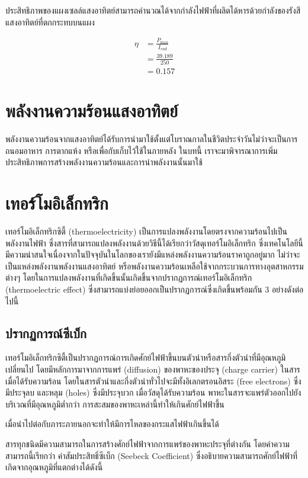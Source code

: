 \documentclass[a4paper,nobib,openany,10pt]{tufte-book}
\begin{document}
ประสิทธิภาพของแผงเซลล์แสงอาทิตย์สามารถคำนวณได้จากกำลังไฟฟ้าที่ผลิตได้หารด้วยกำลังของรังสีแสงอาทิตย์ที่ตกกระทบบนแผง

\begin{align*}
  \eta &= \frac{P_{\max}}{I_{rad}} \\
       &= \frac{39.189}{250} \\
&= 0.157
\end{align*}

\chapter{พลังงานความร้อนแสงอาทิตย์}
\label{sec:orgb5f7623}
พลังงานความร้อนจากแสงอาทิตย์ได้รับการนำมาใช้ตั้งแต่โบราณกาลในชีวิตประจำวันไม่ว่าจะเป็นการถนอมอาหาร
การตากแห้ง หรือเพื่อกับเก็บไว้ใช้ในภายหลัง ในบทนี้
เราจะมาพิจารณาการเพิ่มประสิทธิภาพการสร้างพลังงานความร้อนและการนำพลังงานนั้นมาใช้

\chapter{เทอร์โมอิเล็กทริก}
\label{sec:org4580a17}
เทอร์โมอิเล็กทริกซิตี้ (thermoelectricity) เป็นการแปลงพลังงานโดยตรงจากความร้อนไปเป็นพลังงานไฟฟ้า
ซึ่งสารที่สามารถแปลงพลังงานด้วยวิธีนี้ได้เรียกว่าวัสดุเทอร์โมอิเล็กทริก
ซึ่งเทคโนโลยีนี้มีความน่าสนใจเนื่องจากในปัจจุบันในโลกของเรายังมีแหล่งพลังงานความร้อนราคาถูกอยู่มาก
ไม่ว่าจะเป็นแหล่งพลังงานพลังงานแสงอาทิตย์ หรือพลังงานความร้อนเหลือใช้จากกระบวนการทางอุตสาหกรรมต่างๆ
โดยในการแปลงพลังงานที่เกิดขึ้นนั้นเกิดขึ้นจากปรากฏการณ์เทอร์โมอิเล็กทริก
(thermoelectric effect)
ซึ่งสามารถแบ่งย่อยออกเป็นปรากฏการณ์ซึ่งเกิดขึ้นพร้อมกัน 3
อย่างดังต่อไปนี้

\section{ปรากฏการณ์ซีเบ็ก}
\label{sec:orge95308b}
เทอร์โมอิเล็กทริกซิตี้เป็นปรากฏการณ์การเกิดศักย์ไฟฟ้าขึ้นบนตัวนำหรือสารกึ่งตัวนำที่มีอุณหภูมิเปลี่ยนไป
โดยมีหลักการมาจากการแพร่ (diffusion) ของพาหะของประจุ (charge carrier)
ในสารเมื่อได้รับความร้อน
โดยในสารตัวนำและกึ่งตัวนำทั่วไปจะมีทั้งอิเลกตรอนอิสระ (free electrons)
ซึ่งมีประจุลบ และหลุม (holes) ซึ่งมีประจุบวก เมื่อวัสดุได้รับความร้อน
พาหะในสารจะแพร่ตัวออกไปยังบริเวณที่มีอุณหภูมิต่ำกว่า
การสะสมของพาหะเหล่านี้ทำให้เกินศักย์ไฟฟ้าขึ้น

เมื่อนำไปต่อกับภาระภายนอกจะทำให้มีการไหลของกระแสไฟฟ้าเกินขึ้นได้

สารทุกชนิดมีความสามารถในการสร้างศักย์ไฟฟ้าจากการแพร่ของพาหะประจุที่ต่างกัน
โดยค่าความสามารถนี้เรียกว่า ค่าสัมประสิทธิ์ซีเบ็ก (Seebeck Coefficient)
ซึ่งอธิบายความสามารถศักย์ไฟฟ้าที่เกิดจากอุณหภูมิที่แตกต่างได้ดังนี้
\end{document}
